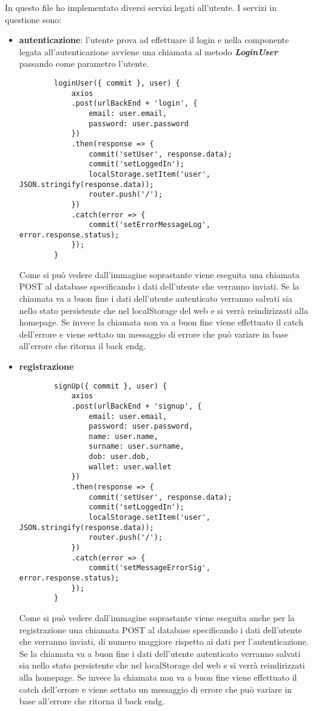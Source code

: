In questo file ho implementato diversi servizi legati all'utente. I servizi in questione sono:
\begin{itemize}
	\item \textbf{autenticazione}: l'utente prova ad effettuare il login e nella componente legata all'autenticazione avviene una chiamata al metodo \textbf{\textit{LoginUser}} passando come parametro l'utente.
	\begin{lstlisting}
		loginUser({ commit }, user) {
			axios
			.post(urlBackEnd + 'login', {
				email: user.email,
				password: user.password
			})
			.then(response => {
				commit('setUser', response.data);
				commit('setLoggedIn');
				localStorage.setItem('user', JSON.stringify(response.data));
				router.push('/');
			})
			.catch(error => {
				commit('setErrorMessageLog', error.response.status);
			});
		}
	\end{lstlisting}
	Come si può vedere dall'immagine soprastante viene eseguita una chiamata POST al database specificando i dati dell'utente che verranno inviati. Se la chiamata va a buon fine i dati dell'utente autenticato verranno salvati sia nello stato persistente che nel localStorage del web e si verrà reindirizzati alla homepage. Se invece la chiamata non va a buon fine viene effettuato il catch dell'errore e viene settato un messaggio di errore che può variare in base all'errore che ritorna il \gls{back endg}.
	\item \textbf{registrazione}
	\begin{lstlisting}
		signUp({ commit }, user) {
			axios
			.post(urlBackEnd + 'signup', {
				email: user.email,
				password: user.password,
				name: user.name,
				surname: user.surname,
				dob: user.dob,
				wallet: user.wallet
			})
			.then(response => {
				commit('setUser', response.data);
				commit('setLoggedIn');
				localStorage.setItem('user', JSON.stringify(response.data));
				router.push('/');
			})
			.catch(error => {
				commit('setMessageErrorSig', error.response.status);
			});
		}
	\end{lstlisting}
	Come si può vedere dall'immagine soprastante viene eseguita anche per la registrazione una chiamata POST al database specificando i dati dell'utente che verranno inviati, di numero maggiore rispetto ai dati per l'autenticazione. Se la chiamata va a buon fine i dati dell'utente autenticato verranno salvati sia nello stato persistente che nel localStorage del web e si verrà reindirizzati alla homepage. Se invece la chiamata non va a buon fine viene effettuato il catch dell'errore e viene settato un messaggio di errore che può variare in base all'errore che ritorna il \gls{back endg}.

\end{itemize}
